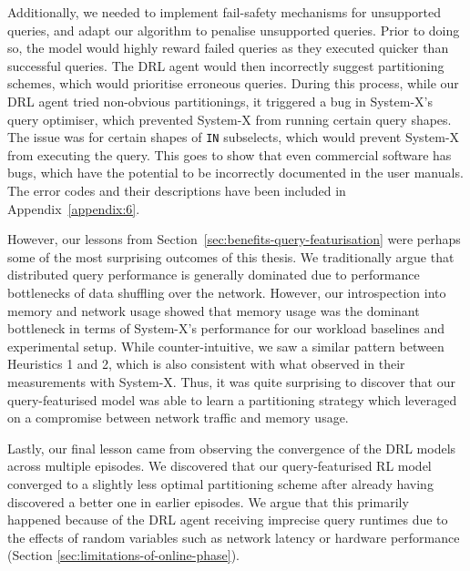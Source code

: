 Additionally, we needed to implement fail-safety mechanisms for unsupported queries, and adapt our algorithm to penalise unsupported queries. Prior to doing so, the model would highly reward failed queries as they executed quicker than successful queries. The DRL agent would then incorrectly suggest partitioning schemes, which would prioritise erroneous queries. During this process, while our DRL agent tried non-obvious partitionings, it triggered a bug in System-X's query optimiser, which prevented System-X from running certain query shapes. The issue was for certain shapes of \texttt{IN} subselects, which would prevent System-X from executing the query. This goes to show that even commercial software has bugs, which have the potential to be incorrectly documented in the user manuals. The error codes and their descriptions have been included in Appendix~\ref{appendix:6}.

However, our lessons from Section~\ref{sec:benefits-query-featurisation} were perhaps some of the most surprising outcomes of this thesis. We traditionally argue that distributed query performance is generally dominated due to performance bottlenecks of data shuffling over the network. However, our introspection into memory and network usage showed that memory usage was the dominant bottleneck in terms of System-X's performance for our workload baselines and experimental setup. While counter-intuitive, we saw a similar pattern between Heuristics 1 and 2, which is also consistent with what \citeauthor{Hilprecht:2019:TLP:3329859.3329876} observed in their measurements with System-X. Thus, it was quite surprising to discover that our query-featurised model was able to learn a partitioning strategy which leveraged on a compromise between network traffic and memory usage.

Lastly, our final lesson came from observing the convergence of the DRL models across multiple episodes. We discovered that our query-featurised RL model converged to a slightly less optimal partitioning scheme after already having discovered a better one in earlier episodes. We argue that this primarily happened because of the DRL agent receiving imprecise query runtimes due to the effects of random variables such as network latency or hardware performance (Section \ref{sec:limitations-of-online-phase}). 

